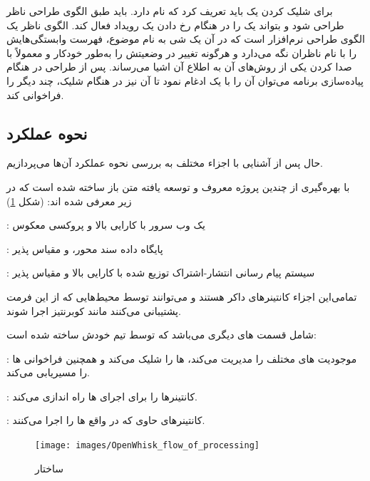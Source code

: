 برای شلیک کردن  یک  باید تعریف کرد که  نام دارد.  باید طبق الگوی طراحی ناظر طراحی شود و بتواند یک  را در هنگام رخ دادن یک رویداد فعال کند. الگوی ناظر یک الگوی طراحی نرم‌افزار است که در آن یک شی به نام موضوع، فهرست وابستگی‌هایش را با نام ناظران نگه می‌دارد و هرگونه تغییر در وضعیتش را به‌طور خودکار و معمولاً با صدا کردن یکی از روش‌های آن به اطلاع آن اشیا می‌رساند. پس از طراحی  در هنگام پیاده‌سازی برنامه می‌توان آن را با یک  ادغام نمود تا آن  نیز در هنگام شلیک، چند  دیگر را فراخوانی کند.

\newpage

\subsection{نحوه عملکرد }

حال پس از آشنایی با اجزاء مختلف  به بررسی نحوه عملکرد آن‌ها می‌پردازیم.

 با بهره‌گیری از چندین پروژه معروف و توسعه یافته متن باز ساخته شده است که در زیر معرفی شده اند: (شکل \ref{OpenWhisk_flow_of_processing})

\textbf{} : یک وب سرور با کارایی بالا و پروکسی معکوس

\textbf{} : پایگاه داده سند محور،  و مقیاس پذیر

\textbf{} : سیستم پیام رسانی انتشار-اشتراک توزیع شده با کارایی بالا و مقیاس پذیر

تمامی‌این اجزاء کانتینرهای داکر هستند و می‌توانند توسط محیط‌هایی که از این فرمت پشتیبانی می‌کنند مانند کوبرنتیز اجرا شوند.
\newline

 شامل قسمت های دیگری می‌باشد که توسط تیم خودش ساخته شده است:

\textbf{} : موجودیت های مختلف را مدیریت می‌کند،  ها را شلیک می‌کند و همچنین فراخوانی  ها را مسیریابی می‌کند.

\textbf{} : کانتینرها را برای اجرای  ها راه اندازی می‌کند.

\textbf{} : کانتینرهای حاوی  که در واقع  ها را اجرا می‌کنند.

\begin{figure}[!h]
	\centering
	\texttt{[image: images/OpenWhisk\_flow\_of\_processing]}
	\caption{ساختار }
	\label{OpenWhisk_flow_of_processing}
\end{figure}


